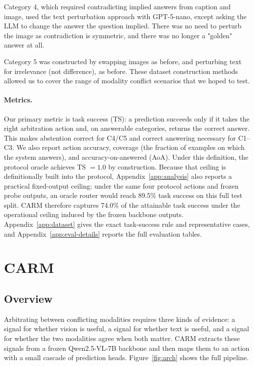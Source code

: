 \documentclass[11pt]{article}
\begin{document}
Category 4, which required contradicting implied answers from caption and image, used the text perturbation approach with GPT-5-nano, except asking the LLM to change the answer the question implied. There was no need to perturb the image as contradiction is symmetric, and there was no longer a "golden" answer at all.

Category 5 was constructed by swapping images as before, and perturbing text for irrelevance (not difference), as before. These dataset construction methods allowed us to cover the range of modality conflict scenarios that we hoped to test.

\paragraph{Metrics.}
Our primary metric is task success (TS): a prediction succeeds only if it takes
the right arbitration action and, on answerable categories, returns the correct answer.
This makes abstention correct for C4/C5 and correct answering necessary for C1--C3. We
also report action accuracy, coverage (the fraction of examples on which
the system answers), and accuracy-on-answered (AoA). Under this definition, the protocol
oracle achieves TS $= 1.0$ by construction. Because that ceiling is definitionally built
into the protocol, Appendix~\ref{app:analysis} also reports a practical fixed-output
ceiling: under the same four protocol actions and frozen probe outputs, an oracle router
would reach 89.5\% task success on this full test split. CARM therefore captures 74.0\%
of the attainable task success under the operational ceiling induced by the frozen
backbone outputs. Appendix~\ref{app:dataset} gives the exact task-success rule and
representative cases, and Appendix~\ref{app:eval-details} reports the full evaluation
tables.


\section{CARM}
\label{sec:method}

\subsection{Overview}

Arbitrating between conflicting modalities requires three kinds of evidence: a signal for
whether vision is useful, a signal for whether text is useful, and a signal for whether the
two modalities agree when both matter. CARM extracts these signals from a frozen
Qwen2.5-VL-7B backbone and then maps them to an action with a small cascade of prediction
heads. Figure~\ref{fig:arch} shows the full pipeline.
\end{document}
